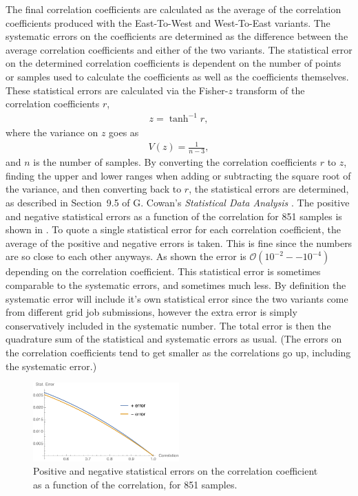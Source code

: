 The final correlation coefficients are calculated as the average of the correlation coefficients produced with the East-To-West and West-To-East variants. The systematic errors on the coefficients are determined as the difference between the average correlation coefficients and either of the two variants. The statistical error on the determined correlation coefficients is dependent on the number of points or samples used to calculate the coefficients as well as the coefficients themselves. These statistical errors are calculated via the Fisher-$z$ transform of the correlation coefficients $r$,
\begin{align}
	z = \tanh^{-1}r,
\end{align}
where the variance on $z$ goes as
\begin{align}
	V(z) = \frac{1}{n-3},
\end{align}
and $n$ is the number of samples. By converting the correlation coefficients $r$ to $z$, finding the upper and lower ranges when adding or subtracting the square root of the variance, and then converting back to $r$, the statistical errors are determined, as described in Section~9.5 of G. Cowan's \textit{Statistical Data Analysis} \cite{Cowan}. The positive and negative statistical errors as a function of the correlation for 851 samples is shown in . To quote a single statistical error for each correlation coefficient, the average of the positive and negative errors is taken. This is fine since the numbers are so close to each other anyways. As shown the error is $\mathcal{O}(10^{-2}--10^{-4})$ depending on the correlation coefficient. This statistical error is sometimes comparable to the systematic errors, and sometimes much less. By definition the systematic error will include it's own statistical error since the two variants come from different grid job submissions, however the extra error is simply conservatively included in the systematic number. The total error is then the quadrature sum of the statistical and systematic errors as usual. (The errors on the correlation coefficients tend to get smaller as the correlations go up, including the systematic error.)


\begin{figure}[h]
\centering
\includegraphics[width=0.5\textwidth]{StatisticalError}
\caption{Positive and negative statistical errors on the correlation coefficient as a function of the correlation, for 851 samples.}
\label{fig:statError}
\end{figure}




